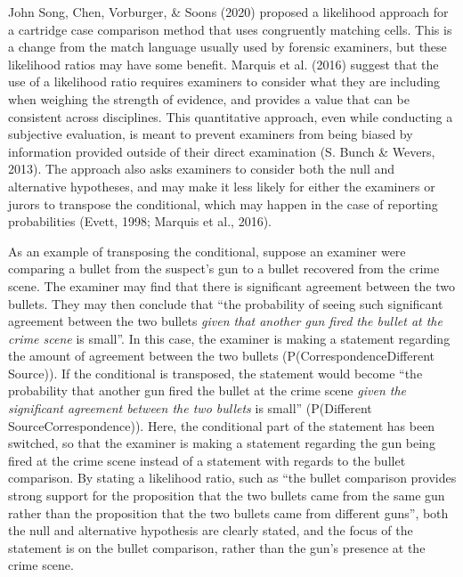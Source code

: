 \documentclass[print]{nuthesis}
\begin{document}
John Song, Chen, Vorburger, \& Soons (2020) proposed a likelihood approach for a cartridge case comparison method that uses congruently matching cells.
This is a change from the match language usually used by forensic examiners, but these likelihood ratios may have some benefit.
Marquis et al. (2016) suggest that the use of a likelihood ratio requires examiners to consider what they are including when weighing the strength of evidence, and provides a value that can be consistent across disciplines.
This quantitative approach, even while conducting a subjective evaluation, is meant to prevent examiners from being biased by information provided outside of their direct examination (S. Bunch \& Wevers, 2013).
The approach also asks examiners to consider both the null and alternative hypotheses, and may make it less likely for either the examiners or jurors to transpose the conditional, which may happen in the case of reporting probabilities (Evett, 1998; Marquis et al., 2016).

As an example of transposing the conditional, suppose an examiner were comparing a bullet from the suspect's gun to a bullet recovered from the crime scene.
The examiner may find that there is significant agreement between the two bullets.
They may then conclude that ``the probability of seeing such significant agreement between the two bullets \emph{given that another gun fired the bullet at the crime scene} is small''.
In this case, the examiner is making a statement regarding the amount of agreement between the two bullets (P(Correspondence\textbar Different Source)).
If the conditional is transposed, the statement would become ``the probability that another gun fired the bullet at the crime scene \emph{given the significant agreement between the two bullets} is small'' (P(Different Source\textbar Correspondence)).
Here, the conditional part of the statement has been switched, so that the examiner is making a statement regarding the gun being fired at the crime scene instead of a statement with regards to the bullet comparison.
By stating a likelihood ratio, such as ``the bullet comparison provides strong support for the proposition that the two bullets came from the same gun rather than the proposition that the two bullets came from different guns'', both the null and alternative hypothesis are clearly stated, and the focus of the statement is on the bullet comparison, rather than the gun's presence at the crime scene.
\end{document}
